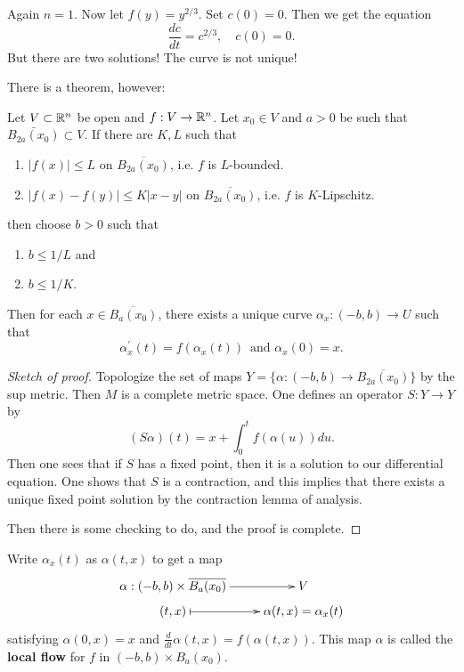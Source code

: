 \documentclass[11pt, english]{article}
\begin{document}
\begin{example}
Again $n=1$. Now let $f(y)=y^{2/3}$.  Set $c(0)=0$. Then we get the equation
\[
\frac{dc}{dt} = c^{2/3}, \quad c(0)=0.
\]
But there are two solutions! The curve is not unique!
\end{example}

There is a theorem, however:
\begin{thm}
Let $V \subset \mathbb{R}^n$ be open and $f:V \to \mathbb{R}^n$. Let $x_0 \in V$ and $a > 0$ be such that $\bar{B_{2a}(x_0)} \subset V$. If there are $K,L$ such that 
\begin{enumerate}
\item $|f(x)| \leq L$ on $\overline{B_{2a}(x_0)}$, i.e. $f$ is $L$-bounded.
\item $|f(x)-f(y)| \leq K|x-y|$ on $\overline{B_{2a}(x_0)}$, i.e. $f$ is $K$-Lipschitz.
\setcounter{enumTemp}{\theenumi}
\end{enumerate}
then choose $b > 0$ such that
\begin{enumerate}
\setcounter{enumi}{\theenumTemp}
\item $b \leq 1/L$ and 
\item $b \leq 1/K$. 
\end{enumerate}
Then for each $x \in \overline{B_a(x_0)}$, there exists a unique curve $\alpha_x:(-b,b) \to U$ such that
\[
\alpha_x^\prime(t) = f(\alpha_x(t)) \, \text{ and } \alpha_x(0)=x.
\]
\end{thm}
\begin{proof}[Sketch of proof] Topologize the set of maps $Y= \{ \alpha:(-b,b) \to \overline{B_{2a}(x_0)}\}$ by the sup metric. Then $M$ is a complete metric space. One defines an operator $S:Y\to Y$ by 
\[
(S\alpha)(t) = x + \int_0^t f(\alpha(u)) du.
\]
Then one sees that if $S$ has a fixed point, then it is a solution to our differential equation. One shows that $S$ is a contraction, and this implies that there exists a unique fixed point solution by the contraction lemma of analysis.

Then there is some checking to do, and the proof is complete.
\end{proof}

Write $\alpha_x(t)$ as $\alpha(t,x)$ to get a map
\[
\xymatrix@R=3pt{
\alpha:(-b,b) \times \overline{B_a(x_0)} \ar[r] & V \\
(t, x ) \ar@{|->}[r] & \alpha(t,x)=\alpha_x(t)
}
\]
satisfying $\alpha(0,x)=x$ and $\frac{d}{dt} \alpha(t,x) = f(\alpha(t,x))$. This map $\alpha$ is called the \textbf{local flow} for $f$ in $(-b,b) \times B_a(x_0)$.
\end{document}
